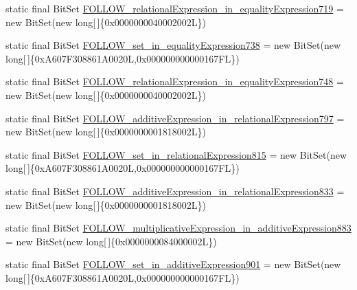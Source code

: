 \begin{DoxyCompactItemize}
\item 
static final Bit\-Set \hyperlink{classorg_1_1tzi_1_1use_1_1parser_1_1ocl_1_1_o_c_l_parser_a8e9eb692ccf746742918e2da8b0262ed}{F\-O\-L\-L\-O\-W\-\_\-relational\-Expression\-\_\-in\-\_\-equality\-Expression719} = new Bit\-Set(new long\mbox{[}$\,$\mbox{]}\{0x0000000040002002\-L\})
\item 
static final Bit\-Set \hyperlink{classorg_1_1tzi_1_1use_1_1parser_1_1ocl_1_1_o_c_l_parser_ad3056a25c08ac88318594008259de715}{F\-O\-L\-L\-O\-W\-\_\-set\-\_\-in\-\_\-equality\-Expression738} = new Bit\-Set(new long\mbox{[}$\,$\mbox{]}\{0x\-A607\-F308861\-A0020\-L,0x000000000000167\-F\-L\})
\item 
static final Bit\-Set \hyperlink{classorg_1_1tzi_1_1use_1_1parser_1_1ocl_1_1_o_c_l_parser_a40871b4cdc4918d77890b71791373068}{F\-O\-L\-L\-O\-W\-\_\-relational\-Expression\-\_\-in\-\_\-equality\-Expression748} = new Bit\-Set(new long\mbox{[}$\,$\mbox{]}\{0x0000000040002002\-L\})
\item 
static final Bit\-Set \hyperlink{classorg_1_1tzi_1_1use_1_1parser_1_1ocl_1_1_o_c_l_parser_a0939dcf4b82de57aa4fde6d10df41af9}{F\-O\-L\-L\-O\-W\-\_\-additive\-Expression\-\_\-in\-\_\-relational\-Expression797} = new Bit\-Set(new long\mbox{[}$\,$\mbox{]}\{0x0000000001818002\-L\})
\item 
static final Bit\-Set \hyperlink{classorg_1_1tzi_1_1use_1_1parser_1_1ocl_1_1_o_c_l_parser_ac6a764f1dc5c9b5dfdf4b5d8e909f9b8}{F\-O\-L\-L\-O\-W\-\_\-set\-\_\-in\-\_\-relational\-Expression815} = new Bit\-Set(new long\mbox{[}$\,$\mbox{]}\{0x\-A607\-F308861\-A0020\-L,0x000000000000167\-F\-L\})
\item 
static final Bit\-Set \hyperlink{classorg_1_1tzi_1_1use_1_1parser_1_1ocl_1_1_o_c_l_parser_a0db952bd2c6cbad70315a3ae09c888c4}{F\-O\-L\-L\-O\-W\-\_\-additive\-Expression\-\_\-in\-\_\-relational\-Expression833} = new Bit\-Set(new long\mbox{[}$\,$\mbox{]}\{0x0000000001818002\-L\})
\item 
static final Bit\-Set \hyperlink{classorg_1_1tzi_1_1use_1_1parser_1_1ocl_1_1_o_c_l_parser_a6476dfa911aed37797d17e4705fe9f39}{F\-O\-L\-L\-O\-W\-\_\-multiplicative\-Expression\-\_\-in\-\_\-additive\-Expression883} = new Bit\-Set(new long\mbox{[}$\,$\mbox{]}\{0x0000000084000002\-L\})
\item 
static final Bit\-Set \hyperlink{classorg_1_1tzi_1_1use_1_1parser_1_1ocl_1_1_o_c_l_parser_abf41cbaf588cfc48ca2b010f4ed63bc8}{F\-O\-L\-L\-O\-W\-\_\-set\-\_\-in\-\_\-additive\-Expression901} = new Bit\-Set(new long\mbox{[}$\,$\mbox{]}\{0x\-A607\-F308861\-A0020\-L,0x000000000000167\-F\-L\})

\end{DoxyCompactItemize}
